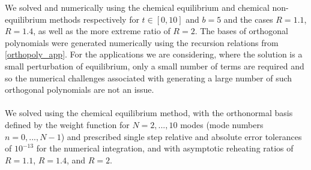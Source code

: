 We solved  and  numerically using the chemical equilibrium and chemical non-equilibrium methods respectively for $t\in[0,10]$ and $b=5$ and the cases $R=1.1$, $R=1.4$, as well as the more extreme ratio of $R=2$.  The bases of orthogonal polynomials were generated numerically using the recursion relations from \ref{orthopoly_app}.  For the applications we are considering, where the solution is a small perturbation of equilibrium, only a small number of terms are required and so the numerical challenges associated with generating a large number of such orthogonal polynomials are not an issue.\\

\\
We solved  using the chemical equilibrium method, with the orthonormal basis defined by the weight function  for $N=2,...,10$ modes (mode numbers $n=0,...,N-1$) and prescribed  single step relative and absolute error tolerances of $10^{-13}$ for the numerical integration, and with asymptotic reheating ratios of $R=1.1$, $R=1.4$, and $R=2$.   




